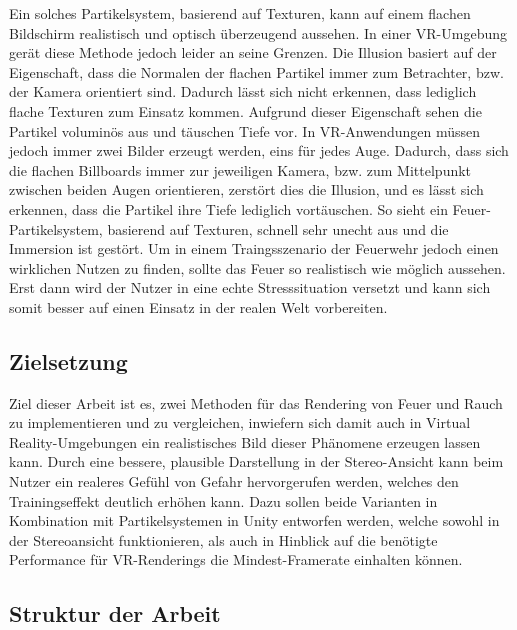 Ein solches Partikelsystem, basierend auf Texturen, kann auf einem flachen Bildschirm realistisch
und optisch überzeugend aussehen. In einer VR-Umgebung gerät diese Methode jedoch leider an seine Grenzen.
Die Illusion basiert auf der Eigenschaft, dass die Normalen der flachen Partikel immer zum Betrachter, bzw. der Kamera
orientiert sind. Dadurch lässt sich nicht erkennen, dass lediglich flache Texturen zum Einsatz kommen.
Aufgrund dieser Eigenschaft sehen die Partikel voluminös aus und täuschen Tiefe vor.
In VR-Anwendungen müssen jedoch immer zwei Bilder erzeugt werden, eins für jedes Auge.
Dadurch, dass sich die flachen Billboards immer zur jeweiligen Kamera, bzw. zum Mittelpunkt
zwischen beiden Augen orientieren, zerstört dies die Illusion, und es lässt sich erkennen, dass
die Partikel ihre Tiefe lediglich vortäuschen. So sieht ein Feuer-Partikelsystem, basierend auf Texturen,
schnell sehr unecht aus und die Immersion ist gestört.
Um in einem Traingsszenario der Feuerwehr jedoch einen wirklichen Nutzen zu finden, sollte das Feuer
so realistisch wie möglich aussehen. Erst dann wird der Nutzer in eine echte Stresssituation versetzt
und kann sich somit besser auf einen Einsatz in der realen Welt vorbereiten.

\subsection{Zielsetzung}

Ziel dieser Arbeit ist es, zwei Methoden für das Rendering von Feuer und Rauch zu implementieren und zu vergleichen, 
inwiefern sich damit auch in Virtual Reality-Umgebungen ein realistisches Bild dieser Phänomene erzeugen lassen kann. 
Durch eine bessere, plausible Darstellung in der 
Stereo-Ansicht kann beim Nutzer ein realeres Gefühl von Gefahr hervorgerufen werden, welches den Trainingseffekt 
deutlich erhöhen kann. Dazu sollen beide Varianten in Kombination mit Partikelsystemen in Unity entworfen werden, 
welche sowohl in der Stereoansicht funktionieren, als auch in Hinblick auf die benötigte Performance für VR-Renderings die 
Mindest-Framerate einhalten können. 


\subsection{Struktur der Arbeit}

